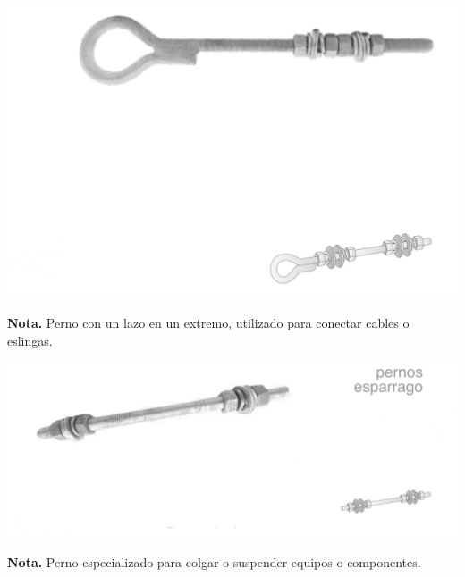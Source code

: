 \noindent
\begin{minipage}[t]{0.48\textwidth}
    \centering
    \includegraphics[width=\linewidth]{fotosherrajes/perno de ojo.png}
    \footnotesize
    \raggedright
    \textbf{Nota.} Perno con un lazo en un extremo, utilizado para conectar cables o eslingas.
\end{minipage}%
\hfill
\begin{minipage}[t]{0.48\textwidth}
    \centering
    \includegraphics[width=\linewidth]{fotosherrajes/perno de suspension.png}
    \footnotesize
    \raggedright
    \textbf{Nota.} Perno especializado para colgar o suspender equipos o componentes.
\end{minipage}

\vspace{1cm}

